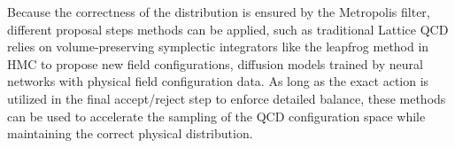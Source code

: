 Because the correctness of the distribution is ensured by the Metropolis filter, different proposal steps methods can be applied, such as traditional Lattice QCD relies on volume-preserving symplectic integrators like the leapfrog method in HMC to propose new field configurations, diffusion models trained by neural networks with physical field configuration data. As long as the exact action is utilized in the final accept/reject step to enforce detailed balance, these methods can be used to accelerate the sampling of the QCD configuration space while maintaining the correct physical distribution.
